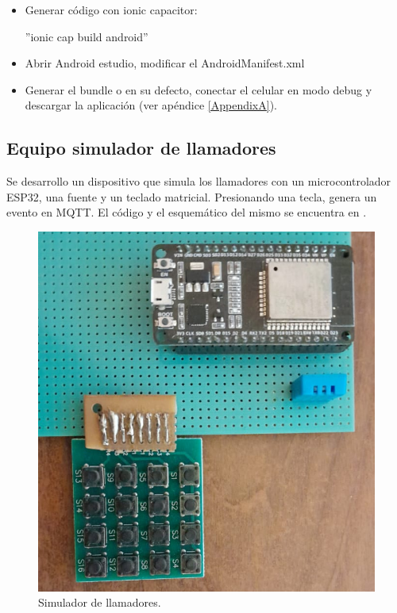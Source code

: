 \begin{itemize}
\item Generar código con ionic capacitor:

''ionic cap build android''
\item Abrir Android estudio, modificar el AndroidManifest.xml
\item Generar el bundle o en su defecto, conectar el celular en modo debug y descargar la aplicación (ver apéndice \ref{AppendixA}).
\end{itemize}
\pagebreak

\pagebreak
\subsection{Equipo simulador de llamadores}

Se desarrollo un dispositivo que simula los llamadores con un microcontrolador ESP32, una fuente y un teclado matricial. Presionando una tecla, genera un evento en MQTT. El código y el esquemático del mismo se encuentra en \citep{WEBSITE:33}. 

\begin{figure}[ht]
	\centering
	\includegraphics[scale=.35]{./Figures/simulador.png}
	\caption{Simulador de llamadores.}
	\label{fig:Simulador de llamadores}
\end{figure}

